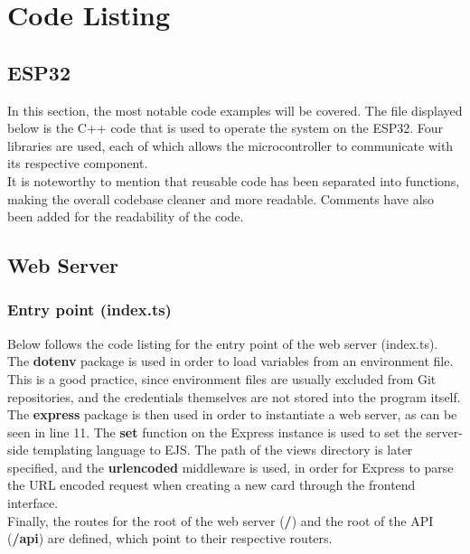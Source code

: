 \documentclass[a4paper,10pt]{article}
\begin{document}
\newpage

\section{Code Listing}
\lstset{style=code}

\subsection{ESP32}

In this section, the most notable code examples will be covered. The file displayed below is the C++ code that is used to operate the system on the ESP32. Four libraries are used, each of which allows the microcontroller to communicate with its respective component. \\
It is noteworthy to mention that reusable code has been separated into functions, making the overall codebase cleaner and more readable. Comments have also been added for the readability of the code.



\newpage

\subsection{Web Server}

\subsubsection{Entry point (index.ts)}

Below follows the code listing for the entry point of the web server (index.ts). The \textbf{dotenv} package is used in order to load variables from an environment file. This is a good practice, since environment files are usually excluded from Git repositories, and the credentials themselves are not stored into the program itself. \\
The \textbf{express} package is then used in order to instantiate a web server, as can be seen in line 11. The \textbf{set} function on the Express instance is used to set the server-side templating language to EJS. The path of the views directory is later specified, and the \textbf{urlencoded} middleware is used, in order for Express to parse the URL encoded request when creating a new card through the frontend interface. \\
Finally, the routes for the root of the web server (\textbf{/}) and the root of the API (\textbf{/api}) are defined, which point to their respective routers.

\end{document}
